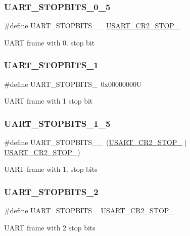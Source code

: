 \subsubsection{\texorpdfstring{UART\_STOPBITS\_0\_5}{UART\_STOPBITS\_0\_5}}
{\footnotesize\ttfamily \#define U\+A\+R\+T\+\_\+\+S\+T\+O\+P\+B\+I\+T\+S\+\_\+\_~\mbox{\hyperlink{group___peripheral___registers___bits___definition_gaee6ee01c6e5325b378b2209ef20d0a61}{U\+S\+A\+R\+T\+\_\+\+C\+R2\+\_\+\+S\+T\+O\+P\+\_}}}

U\+A\+RT frame with 0. stop bit \mbox{\label{group___u_a_r_t___stop___bits_ga7cf97e555292d574de8abc596ba0e2ce}} 
\subsubsection{\texorpdfstring{UART\_STOPBITS\_1}{UART\_STOPBITS\_1}}
{\footnotesize\ttfamily \#define U\+A\+R\+T\+\_\+\+S\+T\+O\+P\+B\+I\+T\+S\+\_~0x00000000U}

U\+A\+RT frame with 1 stop bit \mbox{\label{group___u_a_r_t___stop___bits_ga99fcce2358d8ef0b60cf562e4d9fddd8}} 
\subsubsection{\texorpdfstring{UART\_STOPBITS\_1\_5}{UART\_STOPBITS\_1\_5}}
{\footnotesize\ttfamily \#define U\+A\+R\+T\+\_\+\+S\+T\+O\+P\+B\+I\+T\+S\+\_\+\_~(\mbox{\hyperlink{group___peripheral___registers___bits___definition_gaee6ee01c6e5325b378b2209ef20d0a61}{U\+S\+A\+R\+T\+\_\+\+C\+R2\+\_\+\+S\+T\+O\+P\+\_}} $\vert$ \mbox{\hyperlink{group___peripheral___registers___bits___definition_ga2b24d14f0e5d1c76c878b08aad44d02b}{U\+S\+A\+R\+T\+\_\+\+C\+R2\+\_\+\+S\+T\+O\+P\+\_}})}

U\+A\+RT frame with 1. stop bits \mbox{\label{group___u_a_r_t___stop___bits_ga91616523380f7450aac6cb7e17f0c0f2}} 
\subsubsection{\texorpdfstring{UART\_STOPBITS\_2}{UART\_STOPBITS\_2}}
{\footnotesize\ttfamily \#define U\+A\+R\+T\+\_\+\+S\+T\+O\+P\+B\+I\+T\+S\+\_~\mbox{\hyperlink{group___peripheral___registers___bits___definition_ga2b24d14f0e5d1c76c878b08aad44d02b}{U\+S\+A\+R\+T\+\_\+\+C\+R2\+\_\+\+S\+T\+O\+P\+\_}}}

U\+A\+RT frame with 2 stop bits 